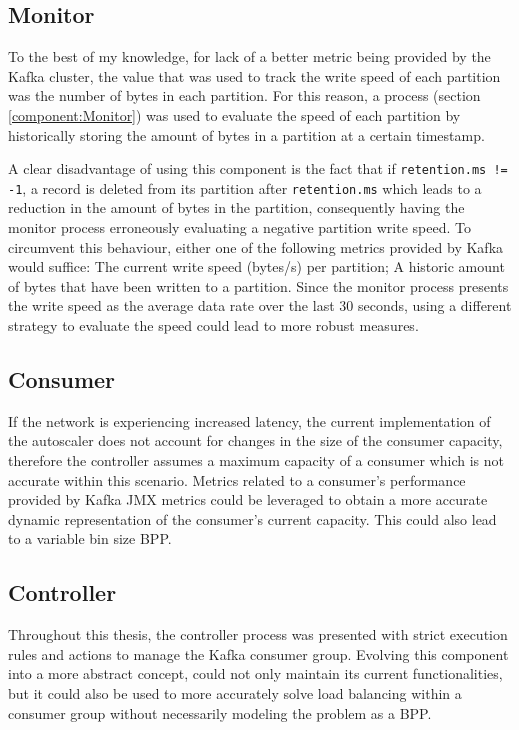 \subsection{Monitor}

To the best of my knowledge, for lack of a better metric being provided by the
Kafka cluster, the value that was used to track the write speed of each
partition was the number of bytes in each partition. For this reason, a process
(section \ref{component:Monitor}) was used to evaluate the speed of each partition by
historically storing the amount of bytes in a partition at a certain timestamp.

A clear disadvantage of using this component is the fact that if
\lstinline{retention.ms != -1}, a record is deleted from its partition after
\lstinline{retention.ms} which leads to a reduction in the amount of bytes in
the partition, consequently having the monitor process erroneously evaluating a
negative partition write speed. To circumvent this behaviour, either one of the
following metrics provided by Kafka would suffice: The current write speed
(bytes/s) per partition; A historic amount of bytes that have been written to a
partition. Since the monitor process presents the write speed as the average
data rate over the last 30 seconds, using a different strategy to evaluate the
speed could lead to more robust measures.

\subsection{Consumer}

If the network is experiencing increased latency, the current implementation of
the autoscaler does not account for changes in the size of the consumer
capacity, therefore the controller assumes a maximum capacity of a consumer
which is not accurate within this scenario. Metrics related to a consumer's
performance provided by Kafka JMX metrics could be leveraged to obtain a more
accurate dynamic representation of the consumer's current capacity. This could
also lead to a variable bin size BPP.

\subsection{Controller}

Throughout this thesis, the controller process was presented with strict
execution rules and actions to manage the Kafka consumer group. Evolving this
component into a more abstract concept, could not only maintain its current
functionalities, but it could also be used to more accurately solve load
balancing within a consumer group without necessarily modeling the problem as a
BPP. 

